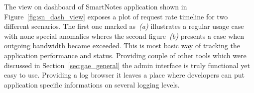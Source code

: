 The view on dashboard of SmartNotes application shown in Figure~\ref{fig:sn_dash_view} exposes a plot of request rate timeline for two different scenarios. The first  one marked as~\textit{(a)} illustrates a regular usage case with none special anomalies wheres the second figure~\textit{(b)} presents a case when outgoing bandwidth became exceeded. This is most basic way of tracking the application performance and status. Providing couple of other tools which were discussed in Section~\ref{sec:gae_general} the admin interface is truly functional yet easy to use. Providing a log browser it leaves a place where developers can put application specific informations on several logging levels.     
\begin{figure}[ht]
  \begin{center}

\end{center}
\end{figure}
